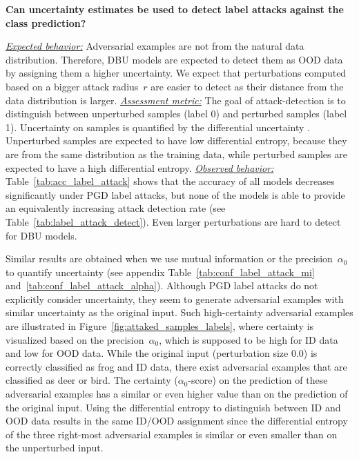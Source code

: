 \begin{center}
	\textbf{Can uncertainty estimates be used to detect label attacks against the class prediction?}	
\end{center}
\underline{\emph{Expected behavior:}} Adversarial examples are not from the natural data distribution. Therefore, DBU models are expected to detect them as OOD data by assigning them a higher uncertainty. We expect that perturbations computed based on a bigger attack radius~$r$ are easier to detect as their distance from the data distribution is larger. 
\underline{\emph{Assessment metric:}} The goal of attack-detection is to distinguish between unperturbed samples (label 0) and perturbed samples (label 1). Uncertainty on samples is quantified by the differential uncertainty \citep{malini2018}. Unperturbed samples are expected to have low differential entropy, because they are from the same distribution as the training data, while perturbed samples are expected to have a high differential entropy. 
\underline{\emph{Observed behavior:}} Table~\ref{tab:acc_label_attack} shows that the accuracy of all models decreases significantly under PGD label attacks, but none of the models is able to provide an equivalently increasing attack detection rate (see Table~\ref{tab:label_attack_detect}). Even larger perturbations are hard to detect for DBU models. 

Similar results are obtained when we use mutual information or the precision~$\alpha_0$ to quantify uncertainty (see appendix Table~\ref{tab:conf_label_attack_mi} and~\ref{tab:conf_label_attack_alpha}).
Although PGD label attacks do not explicitly consider uncertainty, they seem to generate adversarial examples with similar uncertainty as the original input. 
Such high-certainty adversarial examples are illustrated in Figure~\ref{fig:attaked_samples_labels}, where certainty is visualized based on the precision~$\alpha_0$, which is supposed to be high for ID data and low for OOD data. While the original input (perturbation size $0.0$) is correctly classified as frog and ID data, there exist adversarial examples that are classified as deer or bird. The certainty ($\alpha_0$-score) on the prediction of these adversarial examples has a similar or even higher value than on the prediction of the original input. Using the differential entropy to distinguish between ID and OOD data results in the same ID/OOD assignment since the differential entropy of the three right-most adversarial examples is similar or even smaller than on the unperturbed input. 








